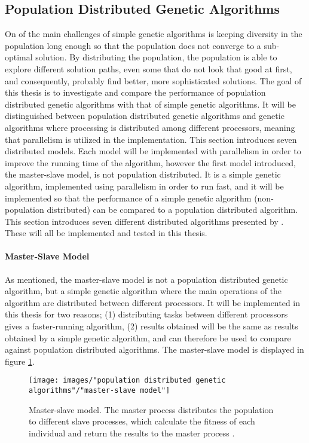 \subsection{Population Distributed Genetic Algorithms}\label{subsection:dga}
On of the main challenges of simple genetic algorithms is keeping diversity in the population long enough so that the population does not converge to a sub-optimal solution. By distributing the population, the population is able to explore different solution paths, even some that do not look that good at first, and consequently, probably find better, more sophisticated solutions. The goal of this thesis is to investigate and compare the performance of population distributed genetic algorithms with that of simple genetic algorithms. It will be distinguished between population distributed genetic algorithms and genetic algorithms where processing is distributed among different processors, meaning that parallelism is utilized in the implementation. This section introduces seven distributed models. Each model will be implemented with parallelism in order to improve the running time of the algorithm, however the first model introduced, the master-slave model, is not population distributed. It is a simple genetic algorithm, implemented using parallelism in order to run fast, and it will be implemented so that the performance of a simple genetic algorithm (non-population distributed) can be compared to a population distributed algorithm. This section introduces seven different distributed algorithms presented by \cite{Gong}. These will all be implemented and tested in this thesis.\\


\paragraph*{Master-Slave Model}
As mentioned, the master-slave model is not a population distributed genetic algorithm, but a simple genetic algorithm where the main operations of the algorithm are distributed between different processors. It will be implemented in this thesis for two reasons; (1) distributing tasks between different processors gives a faster-running algorithm, (2) results obtained will be the same as results obtained by a simple genetic algorithm, and can therefore be used to compare against population distributed algorithms. The master-slave model is displayed in figure \ref{Master-Slave Model}.\\


\begin{figure}[h!]
\begin{center}
\texttt{[image: images/"population distributed genetic algorithms"/"master-slave model"]}
\caption{Master-slave model. The master process distributes the population to different slave processes, which calculate the fitness of each individual and return the results to the master process \citep{Gong}.}
\label{Master-Slave Model}
\end{center}
\end{figure}


